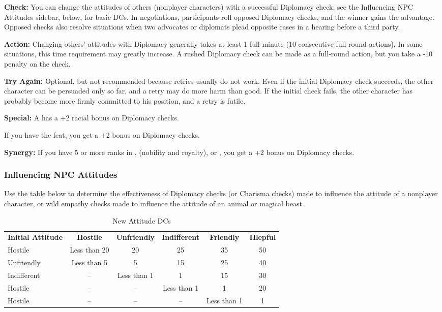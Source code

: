 
\textbf{Check:} You can change the attitudes of others (nonplayer characters) with 
a successful Diplomacy check; see the Influencing NPC Attitudes sidebar, below, 
for basic DCs. In negotiations, participants roll opposed Diplomacy checks, and 
the winner gains the advantage. Opposed checks also resolve situations when two 
advocates or diplomats plead opposite cases in a hearing before a third party.

\textbf{Action:} Changing others' attitudes with Diplomacy generally takes at least 
1 full minute (10 consecutive full-round actions). In some situations, this time 
requirement may greatly increase. A rushed Diplomacy check can be made as a full-round 
action, but you take a -10 penalty on the check.

\textbf{Try Again:} Optional, but not recommended because retries usually do not 
work. Even if the initial Diplomacy check succeeds, the other character can be 
persuaded only so far, and a retry may do more harm than good. If the initial check 
fails, the other character has probably become more firmly committed to his position, 
and a retry is futile.

\textbf{Special:} A  has a +2 racial bonus on Diplomacy checks.

If you have the  feat, you get a +2 bonus on Diplomacy checks.

\textbf{Synergy:} If you have 5 or more ranks in ,  (nobility and 
royalty), or , you get a +2 bonus on Diplomacy checks.

\subsubsection{Influencing NPC Attitudes}

Use the table below to determine the effectiveness of Diplomacy checks (or Charisma 
checks) made to influence the attitude of a nonplayer character, or wild empathy 
checks made to influence the attitude of an animal or magical beast.

\begin{table}[htb]
\caption{New Attitude DCs}
\centering
\begin{tabular}{l *{5}{c}}
\textbf{Initial Attitude} & \textbf{Hostile} & \textbf{Unfriendly} & \textbf{Indifferent} & \textbf{Friendly} & \textbf{Hlepful}\\
Hostile & Less than 20 & 20 & 25 & 35 & 50\\
Unfriendly & Less than 5 & 5 & 15 & 25 & 40\\
Indifferent & -- & Less than 1 & 1 & 15 & 30\\
Hostile & -- & -- & Less than 1 & 1 & 20\\
Hostile & -- & -- & -- & Less than 1 & 1\\
\end{tabular}
\end{table}

